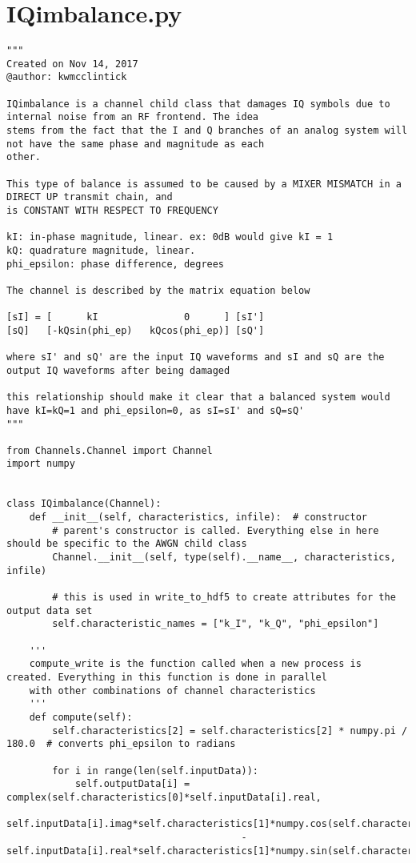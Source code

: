 \section{IQimbalance.py}
\begin{lstlisting}[breaklines]
"""
Created on Nov 14, 2017
@author: kwmcclintick

IQimbalance is a channel child class that damages IQ symbols due to internal noise from an RF frontend. The idea
stems from the fact that the I and Q branches of an analog system will not have the same phase and magnitude as each
other.

This type of balance is assumed to be caused by a MIXER MISMATCH in a DIRECT UP transmit chain, and
is CONSTANT WITH RESPECT TO FREQUENCY

kI: in-phase magnitude, linear. ex: 0dB would give kI = 1
kQ: quadrature magnitude, linear.
phi_epsilon: phase difference, degrees

The channel is described by the matrix equation below

[sI] = [      kI               0      ] [sI']
[sQ]   [-kQsin(phi_ep)   kQcos(phi_ep)] [sQ']

where sI' and sQ' are the input IQ waveforms and sI and sQ are the output IQ waveforms after being damaged

this relationship should make it clear that a balanced system would have kI=kQ=1 and phi_epsilon=0, as sI=sI' and sQ=sQ'
"""

from Channels.Channel import Channel
import numpy


class IQimbalance(Channel):
    def __init__(self, characteristics, infile):  # constructor
        # parent's constructor is called. Everything else in here should be specific to the AWGN child class
        Channel.__init__(self, type(self).__name__, characteristics, infile)

        # this is used in write_to_hdf5 to create attributes for the output data set
        self.characteristic_names = ["k_I", "k_Q", "phi_epsilon"]

    '''
    compute_write is the function called when a new process is created. Everything in this function is done in parallel
    with other combinations of channel characteristics
    '''
    def compute(self):
        self.characteristics[2] = self.characteristics[2] * numpy.pi / 180.0  # converts phi_epsilon to radians

        for i in range(len(self.inputData)):
            self.outputData[i] = complex(self.characteristics[0]*self.inputData[i].real,
                                         self.inputData[i].imag*self.characteristics[1]*numpy.cos(self.characteristics[2])
                                         - self.inputData[i].real*self.characteristics[1]*numpy.sin(self.characteristics[2]))
\end{lstlisting}

